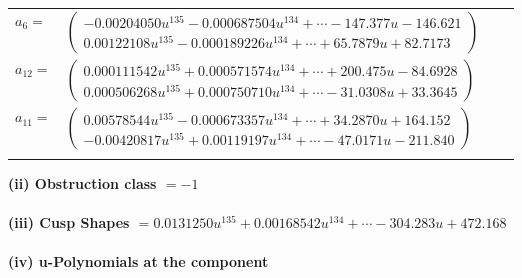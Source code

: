 \documentclass[1p]{elsarticle_modified}
\theoremstyle{definition}
\begin{document}
\begin{tabular}{m{7pt} m{180pt} m{7pt} m{180pt} }
\flushright $a_{6}=$&$\begin{pmatrix}-0.00204050 u^{135}-0.000687504 u^{134}+\cdots-147.377 u-146.621\\0.00122108 u^{135}-0.000189226 u^{134}+\cdots+65.7879 u+82.7173\end{pmatrix}$ \\
\flushright $a_{12}=$&$\begin{pmatrix}0.000111542 u^{135}+0.000571574 u^{134}+\cdots+200.475 u-84.6928\\0.000506268 u^{135}+0.000750710 u^{134}+\cdots-31.0308 u+33.3645\end{pmatrix}$ \\
\flushright $a_{11}=$&$\begin{pmatrix}0.00578544 u^{135}-0.000673357 u^{134}+\cdots+34.2870 u+164.152\\-0.00420817 u^{135}+0.00119197 u^{134}+\cdots-47.0171 u-211.840\end{pmatrix}$\\&\end{tabular}
\flushleft \textbf{(ii) Obstruction class $= -1$}\\~\\
\flushleft \textbf{(iii) Cusp Shapes $= 0.0131250 u^{135}+0.00168542 u^{134}+\cdots-304.283 u+472.168$}\\~\\
\newpage\renewcommand{\arraystretch}{1}
\flushleft \textbf{(iv) u-Polynomials at the component}\newline \\
\end{document}
